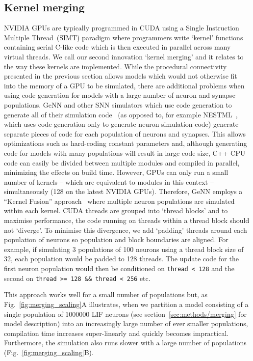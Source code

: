\documentclass[9pt,a4paper]{amsart}
\begin{document}
\subsection{Kernel merging}
\label{sec:results/kernel_merging}
NVIDIA GPUs are typically programmed in CUDA using a Single Instruction Multiple Thread~(SIMT) paradigm where programmers write `kernel' functions containing serial C-like code which is then executed in parallel across many virtual threads.
We call our second innovation `kernel merging' and it relates to the way these kernels are implemented.
While the procedural connectivity presented in the previous section allows models which would not otherwise fit into the memory of a GPU to be simulated, there are additional problems when using code generation for models with a large number of neuron and synapse populations.
GeNN and other SNN simulators which use code generation to generate all of their simulation code~\citep{Blundell2018} (as opposed to, for example NESTML~\citep{Plotnikov2016}, which uses code generation only to generate neuron simulation code) generate separate pieces of code for each population of neurons and synapses.
This allows optimizations such as hard-coding constant parameters and, although generating code for models with many populations will result in large code size, C++ CPU code can easily be divided between multiple modules and compiled in parallel, minimizing the effects on build time.
However, GPUs can only run a small number of kernels -- which are equivalent to modules in this context --  simultaneously (128 on the latest NVIDIA GPUs).
Therefore, GeNN employs a ``Kernel Fusion'' approach~\citep{Wang2010} where multiple neuron populations are simulated within each kernel.
CUDA threads are grouped into `thread blocks' and to maximise performance, the code running on  threads within a thread block should not `diverge'.
To minimise this divergence, we add `padding' threads around each population of neurons so population and block boundaries are aligned.
For example, if simulating 3 populations of \num{100} neurons using a thread block size of 32, each population would be padded to \num{128} threads. 
The update code for the first neuron population would then be conditioned on \lstinline{thread < 128} and the second on \lstinline{thread >= 128 && thread < 256} etc.

This approach works well for a small number of populations but, as Fig.~\ref{fig:merging_scaling}A illustrates, when we partition a model consisting of a single population of \num{1000000} LIF neurons (see section~\ref{sec:methods/merging} for model description) into an increasingly large number of ever smaller populations, compilation time increases super-linearly and quickly becomes impractical.
Furthermore, the simulation also runs slower with a large number of populations (Fig.~\ref{fig:merging_scaling}B).
\end{document}
